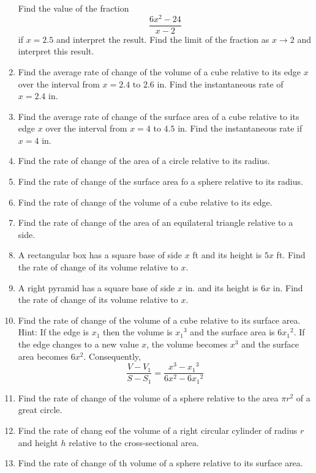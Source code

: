 \documentclass{report}
\begin{document}
\begin{enumerate}
            Find the value of the fraction \[\dfrac{6x^2 - 24}{x - 2}\] if $x = 2.5$ and interpret the result. Find the limit of the fraction as $x \to
                  2$ and interpret this result.
      \item Find the average rate of change of the volume of a cube relative to its edge
            $x$ over the interval from $x = 2.4$ to $2.6$ in. Find the instantaneous rate
            of $x = 2.4$ in.
      \item Find the average rate of change of the surface area of a cube relative to its
            edge $x$ over the interval from $x = 4$ to $4.5$ in. Find the instantaneous
            rate if $x = 4$ in.
      \item Find the rate of change of the area of a circle relative to its radius.
      \item Find the rate of change of the surface area fo a sphere relative to its radius.
      \item Find the rate of change of the volume of a cube relative to its edge.
      \item Find the rate of change of the area of an equilateral triangle relative to a
            side.
      \item A rectangular box has a square base of side $x$ ft and its height is $5x$ ft.
            Find the rate of change of its volume relative to $x$.
      \item A right pyramid has a square base of side $x$ in. and its height is $6x$ in.
            Find the rate of change of its volume relative to $x$.
      \item Find the rate of change of the volume of a cube relative to its surface area.
            Hint: If the edge is $x_1$ then the volume is ${x_1}^3$ and the surface area is
            $6{x_1}^2$. If the edge changes to a new value $x$, the volume becomes $x^3$
            and the surface area becomes $6x^2$. Consequently, \[\dfrac{V - V_1}{S - S_1} = \dfrac{x^3 - {x_1}^3}{6x^2 - 6{x_1}^2}\]
            \vspace{-1.2em}
      \item Find the rate of change of the volume of a sphere relative to the area $\pi
                  r^2$ of a great circle.
      \item Find the rate of chang eof the volume of a right circular cylinder of radius
            $r$ and height $h$ relative to the cross-sectional area.
      \item Find the rate of change of th volume of a sphere relative to its surface area.

\end{enumerate}
\end{document}

